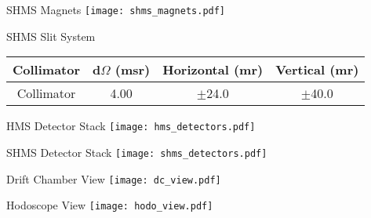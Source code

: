\begin{Mfigure}{SHMS Magnets}
  \centering
  \texttt{[image: shms\_magnets.pdf]}
  \caption{Overview of SHMS optical setup.}
  \label{fig:2-4_shms_magnets}
\end{Mfigure}

\begin{Mtable}{SHMS Slit System}
  \centering
  \begin{tabular}{|c|c|c|c|}
    \hline
    \textbf{Collimator} & \textbf{d$\Omega$ (msr)} & \textbf{Horizontal (mr)} & \textbf{Vertical (mr)} \\
    \hline
     Collimator & 4.00 & $\pm$24.0 & $\pm$40.0 \\
    \hline
  \end{tabular}
  \caption{Breakdown of SHMS slit system's apertures.}
  \label{tab:2-4_shms_slit}
\end{Mtable}

\begin{Mfigure}{HMS Detector Stack}
  \centering
  \texttt{[image: hms\_detectors.pdf]}
  \caption{Overview of HMS Detector Stack.}
  \label{fig:2-4_hms_detectors}
\end{Mfigure}

\begin{Mfigure}{SHMS Detector Stack}
  \centering
  \texttt{[image: shms\_detectors.pdf]}
  \caption{Overview of SHMS Detector Stack.}
  \label{fig:2-4_shms_detectors}
\end{Mfigure}

\begin{Mfigure}{Drift Chamber View}
  \centering
  \texttt{[image: dc\_view.pdf]}
  \caption{Basic design and components of DC1 (left) and DC2 (right).}
  \label{fig:2-4_dc_view}
\end{Mfigure}

\begin{Mfigure}{Hodoscope View}
  \centering
  \texttt{[image: hodo\_view.pdf]}
  \caption{Basic design of a hodoscope pair.}
  \label{fig:2-4_hodo_view}
\end{Mfigure}